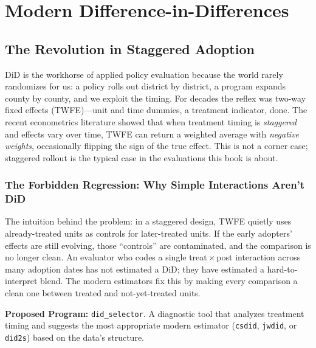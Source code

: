 \documentclass[
    a4paper,
    fontsize=10pt,
    twoside=true,
    numbers=noenddot,
]{kaobook}
\begin{document}
\chapter{Modern Difference-in-Differences}
\section{The Revolution in Staggered Adoption}
DiD is the workhorse of applied policy evaluation because the world rarely randomizes for us: a policy rolls out district by district, a program expands county by county, and we exploit the timing. For decades the reflex was two-way fixed effects (TWFE)---unit and time dummies, a treatment indicator, done. The recent econometrics literature showed that when treatment timing is \emph{staggered} and effects vary over time, TWFE can return a weighted average with \emph{negative weights}, occasionally flipping the sign of the true effect. This is not a corner case; staggered rollout is the typical case in the evaluations this book is about.

\subsection{The Forbidden Regression: Why Simple Interactions Aren't DiD}
The intuition behind the problem: in a staggered design, TWFE quietly uses already-treated units as controls for later-treated units. If the early adopters' effects are still evolving, those \enquote{controls} are contaminated, and the comparison is no longer clean. An evaluator who codes a single treat\,$\times$\,post interaction across many adoption dates has not estimated a DiD; they have estimated a hard-to-interpret blend. The modern estimators fix this by making every comparison a clean one between treated and not-yet-treated units.


\begin{kaobox}[frametitle=Ado-file Idea: \texttt{did\_selector}]
\textbf{Proposed Program:} \texttt{did\_selector}. A diagnostic tool that analyzes treatment timing and suggests the most appropriate modern estimator (\texttt{csdid}, \texttt{jwdid}, or \texttt{did2s}) based on the data's structure.
\end{kaobox}
\end{document}
